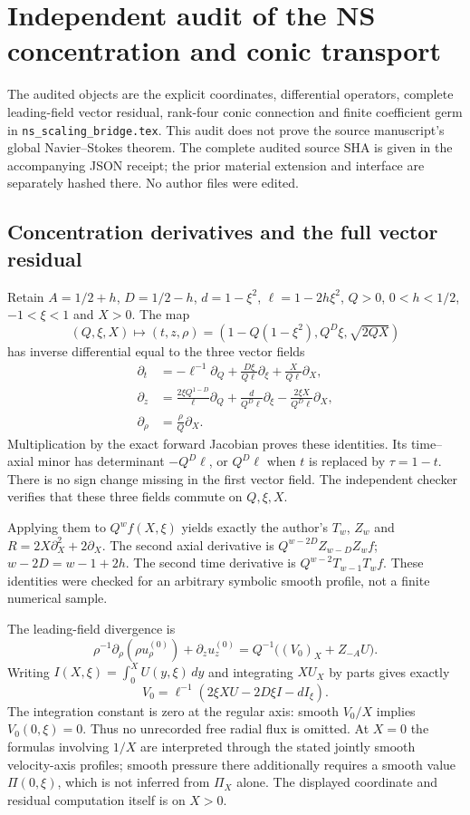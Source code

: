 \section*{Independent audit of the NS concentration and conic transport}

The audited objects are the explicit coordinates, differential operators,
complete leading-field vector residual, rank-four conic connection and
finite coefficient germ in \texttt{ns\_scaling\_bridge.tex}. This audit
does not prove the source manuscript's global Navier--Stokes theorem.
The complete audited source SHA is given in the accompanying JSON receipt;
the prior material extension and interface are separately hashed there.
No author files were edited.

\subsection*{Concentration derivatives and the full vector residual}

Retain $A=1/2+h$, $D=1/2-h$, $d=1-\xi^2$,
$\ell=1-2h\xi^2$, $Q>0$, $0<h<1/2$, $-1<\xi<1$ and $X>0$.
The map
\[
 (Q,\xi,X)\longmapsto
 (t,z,\rho)=(1-Q(1-\xi^2),Q^D\xi,\sqrt{2QX})
\]
has inverse differential equal to the three vector fields
\begin{align*}
 \partial_t&=-\ell^{-1}\partial_Q
      +\frac{D\xi}{Q\ell}\partial_\xi
      +\frac X{Q\ell}\partial_X,\\
 \partial_z&=\frac{2\xi Q^{1-D}}\ell\partial_Q
      +\frac d{Q^D\ell}\partial_\xi
      -\frac{2\xi X}{Q^D\ell}\partial_X,\\
 \partial_\rho&=\frac\rho Q\partial_X.
\end{align*}
Multiplication by the exact forward Jacobian proves these identities.
Its time--axial minor has determinant $-Q^D\ell$, or $Q^D\ell$
when $t$ is replaced by $\tau=1-t$. There is no sign change
missing in the first vector field. The independent checker verifies
that these three fields commute on $Q,\xi,X$.

Applying them to $Q^wf(X,\xi)$ yields exactly the author's
$T_w$, $Z_w$ and $R=2X\partial_X^2+2\partial_X$.
The second axial derivative is $Q^{w-2D}Z_{w-D}Z_wf$;
$w-2D=w-1+2h$. The second time derivative is
$Q^{w-2}T_{w-1}T_wf$. These identities were checked for an
arbitrary symbolic smooth profile, not a finite numerical sample.

The leading-field divergence is
\[
 \rho^{-1}\partial_\rho(\rho u_\rho^{(0)})
       +\partial_z u_z^{(0)}
   =Q^{-1}\bigl((V_0)_X+Z_{-A}U\bigr).
\]
Writing $I(X,\xi)=\int_0^XU(y,\xi)\,dy$ and integrating
$XU_X$ by parts gives exactly
\[
 V_0=\ell^{-1}(2\xi XU-2D\xi I-d I_\xi).
\]
The integration constant is zero at the regular axis: smooth
$V_0/X$ implies $V_0(0,\xi)=0$. Thus no unrecorded free radial
flux is omitted. At $X=0$ the formulas involving $1/X$ are
interpreted through the stated jointly smooth velocity-axis profiles;
smooth pressure there additionally requires a smooth value
$\Pi(0,\xi)$, which is not inferred from $\Pi_X$ alone. The displayed
coordinate and residual computation itself is on $X>0$.

